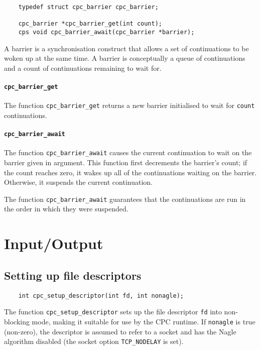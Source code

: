 \documentclass[a4paper]{report}
\begin{document}
\begin{verbatim}
    typedef struct cpc_barrier cpc_barrier;

    cpc_barrier *cpc_barrier_get(int count);
    cps void cpc_barrier_await(cpc_barrier *barrier);
\end{verbatim}

A barrier is a synchronisation construct that allows a set of
continuations to be woken up at the same time.  A barrier is
conceptually a queue of continuations and a count of continuations
remaining to wait for.

\paragraph{\tt cpc\_barrier\_get} The function {\tt cpc\_barrier\_get}
returns a new barrier initialised to wait for {\tt count}
continuations.

\paragraph{\tt cpc\_barrier\_await} The function {\tt cpc\_barrier\_await}
causes the current continuation to wait on the barrier given in
argument.  This function first decrements the barrier's count; if the
count reaches zero, it wakes up all of the continuations waiting on
the barrier.  Otherwise, it suspends the current continuation.

The function {\tt cpc\_barrier\_await} guarantees that the
continuations are run in the order in which they were suspended.

\section{Input/Output}

\subsection{Setting up file descriptors}

\begin{verbatim}
    int cpc_setup_descriptor(int fd, int nonagle);
\end{verbatim}

The function \verb|cpc_setup_descriptor| sets up the file descriptor
\verb|fd| into non-blocking mode, making it suitable for use by the
CPC runtime.  If \verb|nonagle| is true (non-zero), the descriptor is
assumed to refer to a socket and has the Nagle algorithm disabled (the
socket option \verb|TCP_NODELAY| is set).
\end{document}
